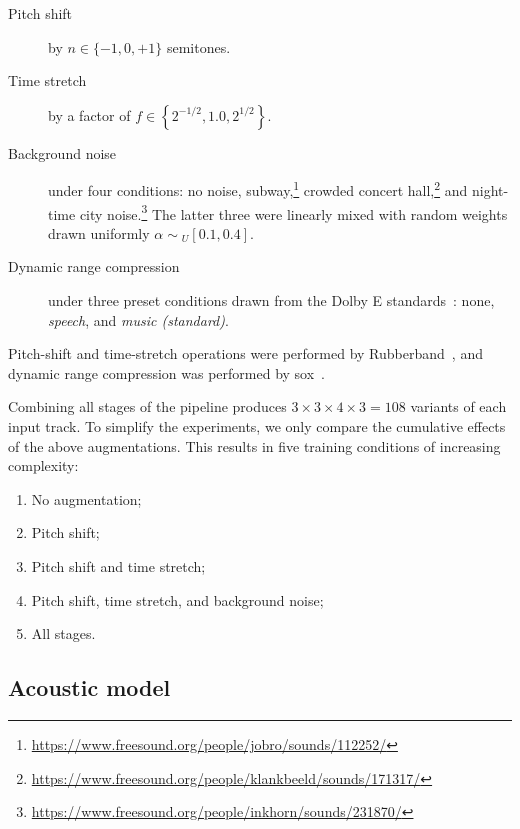 \documentclass{article}
\begin{document}
\begin{description}
    \item[Pitch shift] by $n \in \{-1, 0, +1\}$ semitones.
    \item[Time stretch] by a factor of $f \in \left\{ 2^{-1/2}, 1.0, 2^{1/2}\right\}$.
    \item[Background noise] under four conditions: no noise,
        subway,\footnote{\url{https://www.freesound.org/people/jobro/sounds/112252/}}
        crowded concert hall,\footnote{\url{https://www.freesound.org/people/klankbeeld/sounds/171317/}}
        and night-time city noise.\footnote{\url{https://www.freesound.org/people/inkhorn/sounds/231870/}}
        The latter three were linearly mixed with random weights drawn uniformly
        $\alpha \sim { }_U[0.1, 0.4]$.
    \item[Dynamic range compression] under three preset conditions drawn from the {Dolby E}
        standards~\cite{dolbyE}: none, \emph{speech},
        and \emph{music (standard)}.
\end{description}

Pitch-shift and time-stretch operations were performed by Rubberband~\cite{rubberband}, and dynamic range
compression was performed by sox~\cite{sox}.

Combining all stages of the pipeline produces {$3\times 3\times 4\times 3 = 108$} variants of each input track.  To
simplify the experiments, we only compare the cumulative effects of the above
augmentations.  This results in five training conditions of increasing complexity:
\begin{enumerate}
    \item No augmentation;
        \vspace{-.5\baselineskip}
    \item Pitch shift;
        \vspace{-.5\baselineskip}
    \item Pitch shift and time stretch;
        \vspace{-.5\baselineskip}
    \item Pitch shift, time stretch, and background noise;
        \vspace{-.5\baselineskip}
    \item All stages.
\end{enumerate}

\subsection{Acoustic model}
\end{document}
